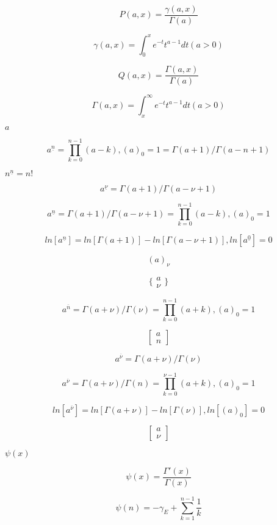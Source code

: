 \documentclass{article}
\begin{document}
\[ P(a,x) = \frac{\gamma(a,x)}{\Gamma(a)} \]
\pagebreak

\[ \gamma(a,x) = \int_0^x e^{-t}t^{a-1}dt (a > 0) \]
\pagebreak

\[ Q(a,x) = \frac{\Gamma(a,x)}{\Gamma(a)} \]
\pagebreak

\[ \Gamma(a,x) = \int_x^\infty e^{-t}t^{a-1}dt (a > 0) \]
\pagebreak

$ a $
\pagebreak

\[ a^{\underline{n}} = \prod_{k=0}^{n-1} (a - k), (a)_0 = 1 = \Gamma(a + 1) / \Gamma(a - n + 1) \]
\pagebreak

$ n^{\underline{n}} = n! $
\pagebreak

\[ a^{\underline{\nu}} = \Gamma(a + 1) / \Gamma(a - \nu + 1) \]
\pagebreak

\[ a^{\underline{n}} = \Gamma(a + 1) / \Gamma(a - \nu + 1) = \prod_{k=0}^{n-1} (a - k), (a)_0 = 1 \]
\pagebreak

\[ ln[a^{\underline{n}}] = ln[\Gamma(a + 1)] - ln[\Gamma(a - \nu + 1)], ln[a^{\underline{0}}] = 0 \]
\pagebreak

\[ (a)_\nu \]
\pagebreak

\[ \{ \begin{array}{c} a \\ \nu \end{array} \} \]
\pagebreak

\[ a^{\overline{n}} = \Gamma(a + \nu) / \Gamma(\nu) = \prod_{k=0}^{n-1} (a + k), (a)_0 = 1 \]
\pagebreak

\[ \left[ \begin{array}{c} a \\ n \end{array} \right] \]
\pagebreak

\[ a^{\overline{\nu}} = \Gamma(a + \nu) / \Gamma(\nu) \]
\pagebreak

\[ a^{\overline{\nu}} = \Gamma(a + \nu) / \Gamma(n) = \prod_{k=0}^{\nu-1} (a + k), (a)_0 = 1 \]
\pagebreak

\[ ln[a^{\overline{\nu}}] = ln[\Gamma(a + \nu)] - ln[\Gamma(\nu)], ln[(a)_0] = 0 \]
\pagebreak

\[ \left[ \begin{array}{c} a \\ \nu \end{array} \right] \]
\pagebreak

$ \psi(x) $
\pagebreak

\[ \psi(x) = \frac{\Gamma'(x)}{\Gamma(x)} \]
\pagebreak

\[ \psi(n) = -\gamma_E + \sum_{k=1}^{n-1} \frac{1}{k} \]
\pagebreak
\end{document}
